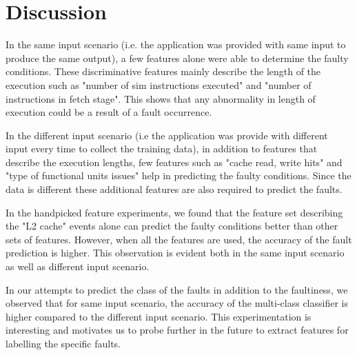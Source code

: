 \section{Discussion}
In the same input scenario (i.e. the application was provided with same input to produce the same output), a few features alone were able to determine the faulty conditions. These discriminative features mainly describe the length of the execution such as "number of sim instructions executed" and "number of instructions in fetch stage". This shows that any abnormality in length of execution could be a result of a fault occurrence. 

In the different input scenario (i.e the application was provide with different input every time to collect the training data), in addition to features that describe the execution lengths, few features such as "cache read, write hits" and "type of functional units issues" help in predicting the faulty conditions. Since the data is different these additional features are also required to predict the faults. 

In the handpicked feature experiments, we found that the feature set describing the "L2 cache" events alone can predict the faulty conditions better than other sets of features. However, when all the features are used, the accuracy of the fault prediction is higher. This observation is evident both in the same input scenario as well as different input scenario. 

In our attempts to predict the class of the faults in addition to the faultiness, we observed that for same input scenario, the accuracy of the multi-class classifier is higher compared to the different input scenario. This experimentation is interesting and motivates us to probe further in the future to extract features for labelling the specific faults.